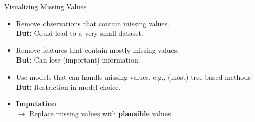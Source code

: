 \begin{vbframe}{Visualizing Missing Values}
\begin{itemize}
\item  Remove observations that contain missing values. \\
    \textbf{But:} Could lead to a very small dataset.

\item Remove features that contain mostly missing values. \\
    \textbf{But:} Can lose (important) information.

\item Use models that can handle missing values, e.g., (most) tree-based methods \\
    \textbf{But:} Restriction in model choice.

\item \textbf{Imputation} \\
    $\rightarrow$ Replace missing values with \textbf{plausible} values.
\end{itemize}
\end{vbframe}

